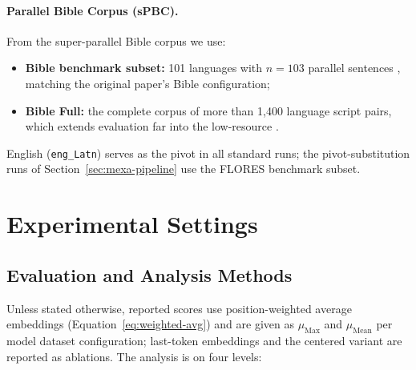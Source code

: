 \paragraph{Parallel Bible Corpus (sPBC).}
From the super-parallel Bible corpus \citep{mayer2014bible} we use:
\begin{itemize}
    \item \textbf{Bible benchmark subset:} 101 languages with $n = 103$
    parallel sentences , matching the original paper's Bible configuration;
    \item \textbf{Bible Full:} the complete corpus of more than 1{,}400
    language script pairs, which extends evaluation far into the
    low-resource .
\end{itemize}

English (\texttt{eng\_Latn}) serves as the pivot in all standard runs; the
pivot-substitution runs of Section~\ref{sec:mexa-pipeline} use the FLORES
benchmark subset.

\section{Experimental Settings}
\label{sec:experimental-settings}

\subsection{Evaluation and Analysis Methods}
\label{subsec:analysis-methods}

Unless stated otherwise, reported scores use position-weighted average
embeddings (Equation~\eqref{eq:weighted-avg}) and are given as
$\mu_{\text{Max}}$ and $\mu_{\text{Mean}}$ per model dataset
configuration; last-token embeddings and the centered variant are reported as ablations. The analysis is  on four levels:

